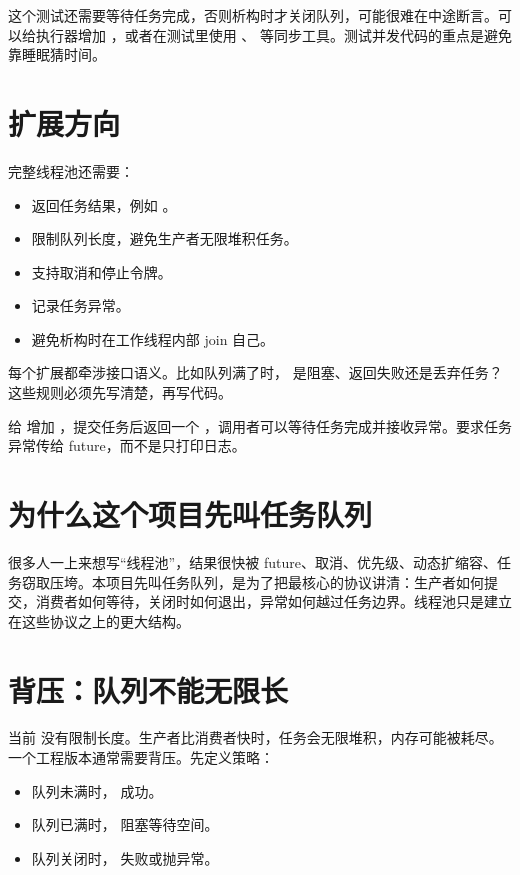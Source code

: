 这个测试还需要等待任务完成，否则析构时才关闭队列，可能很难在中途断言。可以给执行器增加 ，或者在测试里使用 、 等同步工具。测试并发代码的重点是避免靠睡眠猜时间。

\section{扩展方向}

完整线程池还需要：

\begin{itemize}
  \item 返回任务结果，例如 。
  \item 限制队列长度，避免生产者无限堆积任务。
  \item 支持取消和停止令牌。
  \item 记录任务异常。
  \item 避免析构时在工作线程内部 join 自己。
\end{itemize}

每个扩展都牵涉接口语义。比如队列满了时， 是阻塞、返回失败还是丢弃任务？这些规则必须先写清楚，再写代码。

\begin{exercisebox}
给  增加 ，提交任务后返回一个 ，调用者可以等待任务完成并接收异常。要求任务异常传给 future，而不是只打印日志。
\end{exercisebox}

\section{为什么这个项目先叫任务队列}

很多人一上来想写“线程池”，结果很快被 future、取消、优先级、动态扩缩容、任务窃取压垮。本项目先叫任务队列，是为了把最核心的协议讲清：生产者如何提交，消费者如何等待，关闭时如何退出，异常如何越过任务边界。线程池只是建立在这些协议之上的更大结构。

\section{背压：队列不能无限长}

当前  没有限制长度。生产者比消费者快时，任务会无限堆积，内存可能被耗尽。一个工程版本通常需要背压。先定义策略：

\begin{itemize}
  \item 队列未满时， 成功。
  \item 队列已满时， 阻塞等待空间。
  \item 队列关闭时， 失败或抛异常。
\end{itemize}


